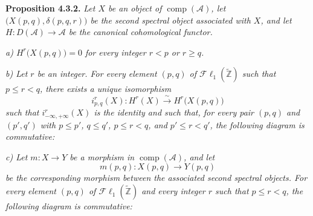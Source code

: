\clearpage
{}%
\begingroup\small\setlength{\parskip}{0pt}\setlength{\emergencystretch}{1.5em}
\setlength{\abovedisplayskip}{4pt plus 2pt minus 2pt}%
\setlength{\belowdisplayskip}{4pt plus 2pt minus 2pt}%

\noindent\textbf{Proposition 4.3.2.}\quad
\textit{Let $X$ be an object of $\operatorname{comp}(\mathcal A)$, let
$\bigl(X(p,q),\delta(p,q,r)\bigr)$ be the second spectral object associated
with $X$, and let $H\colon D(\mathcal A)\longrightarrow\mathcal A$ be the
canonical cohomological functor.}

\noindent\textit{a) $H^r\bigl(X(p,q)\bigr)=0$ for every integer $r<p$ or
$r\geq q$.}

\noindent\textit{b) Let $r$ be an integer. For every element $(p,q)$ of
$\mathcal{F}\ell_1(\widetilde{\mathbb Z})$ such that $p\leq r<q$, there
exists a unique isomorphism}
\[
i_{p,q}^r(X)\colon H^r(X)\xrightarrow{\sim}H^r\bigl(X(p,q)\bigr)
\]
\noindent\textit{such that $i_{-\infty,+\infty}^r(X)$ is the identity and
such that, for every pair $(p,q)$ and $(p',q')$ with $p\leq p'$,
$q\leq q'$, $p\leq r<q$, and $p'\leq r<q'$, the following diagram is
commutative:}

\begin{center}
\end{center}

\noindent\textit{c) Let $m\colon X\longrightarrow Y$ be a morphism in
$\operatorname{comp}(\mathcal A)$, and let}
\[
m(p,q)\colon X(p,q)\longrightarrow Y(p,q)
\]
\noindent\textit{be the corresponding morphism between the associated
second spectral objects. For every element $(p,q)$ of
$\mathcal{F}\ell_1(\widetilde{\mathbb Z})$ and every integer $r$ such that
$p\leq r<q$, the following diagram is commutative:}

